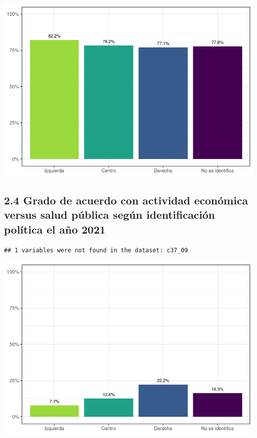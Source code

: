 \documentclass[
  12pt,
]{book}
\begin{document}
\includegraphics{reporte-elsoc_files/figure-latex/unnamed-chunk-18-1.pdf}

\hypertarget{grado-de-acuerdo-con-actividad-econuxf3mica-versus-salud-puxfablica-seguxfan-identificaciuxf3n-poluxedtica-el-auxf1o-2021}{%
\subsection{2.4 Grado de acuerdo con actividad económica versus salud pública según identificación política el año 2021}\label{grado-de-acuerdo-con-actividad-econuxf3mica-versus-salud-puxfablica-seguxfan-identificaciuxf3n-poluxedtica-el-auxf1o-2021}}

\begin{verbatim}
## 1 variables were not found in the dataset: c37_09
\end{verbatim}

\includegraphics{reporte-elsoc_files/figure-latex/unnamed-chunk-19-1.pdf}
\end{document}
